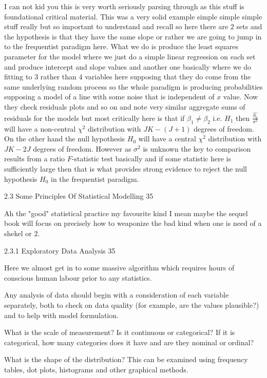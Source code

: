 I can not kid you this is very worth seriously parsing through as this stuff is foundational critical material. This was a very solid example simple simple simple stuff really but so important to understand and recall so here there are $2$ sets and the hypothesis is that they have the same slope or rather we are going to jump in to the frequentist paradigm here. What we do is produce the least squares parameter for the model where we just do a simple linear regression on each set and produce intercept and slope values and another one basically where we do fitting to $3$ rather than $4$ variables here supposing that they do come from the same underlying random process so the whole paradigm is producing probabilities supposing a model of a line with some noise that is independent of $x$ value. Now they check residuals plots and so on and note very similar aggregate sums of residuals for the models but most critically here is that if $\beta_1 \neq \beta_2$ i.e. $H_1$ then $\frac{\hat{S_0}}{\sigma^2}$ will have a non-central $\chi^2$ distribution with $JK-(J+1)$ degrees of freedom. On the other hand the null hypothesis $H_0$ will have a central $\chi^2$ distribution with $JK-2J$ degrees of freedom. However as $\sigma^2$ is unknown the key to comparison results from a ratio $F$-statistic test basically and if some statistic here is sufficiently large then that is what provides strong evidence to reject the null hypothesis $H_0$ in the frequentist paradigm.

2.3 Some Principles Of Statistical Modelling 35

Ah the "good" statistical practice my favourite kind I mean maybe the sequel book will focus on precisely how to weaponize the bad kind when one is need of a shekel or $2$.

2.3.1 Exploratory Data Analysis 35

Here we almost get in to some massive algorithm which requires hours of conscious human labour prior to any statistics.

Any analysis of data should begin with a consideration of each variable separately, both to check on data quality (for example, are the values plausible?) and to help with model formulation.

What is the scale of measurement? Is it continuous or categorical? If it is categorical, how many categories does it have and are they nominal or ordinal?

What is the shape of the distribution? This can be examined using frequency tables, dot plots, histograms and other graphical methods.

